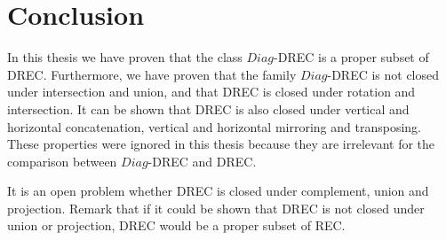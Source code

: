 \section{Conclusion}
In this thesis we have proven that the class $Diag$-DREC is a proper subset of DREC. Furthermore, we
have proven that the family $Diag$-DREC is not closed under intersection and union, and that DREC is
closed under rotation and intersection. It can be shown that DREC is also closed under vertical and
horizontal concatenation, vertical and horizontal mirroring and transposing. These properties were
ignored in this thesis because they are irrelevant for the comparison between $Diag$-DREC and DREC.

It is an open problem whether DREC is closed under complement, union and projection. Remark that if
it could be shown that DREC is not closed under union or projection, DREC would be a proper
subset of REC.
